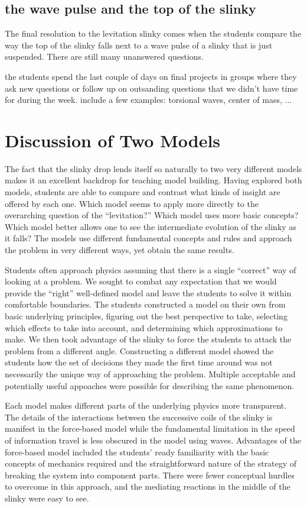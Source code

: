 \documentclass[aps,pre,10pt,superscriptaddress,showpacs,amsmath,amssymb,nofootinbib]{revtex4-1}
\begin{document}
\subsection{the wave pulse and the top of the slinky }
The final resolution to the levitation slinky comes when the students compare
the way the top of the slinky falls next to a wave pulse of a slinky that is
just suspended.  There are still many unanswered questions.

the students spend the last couple of days on final projects in groups where
they ask new questions or follow up on outsanding questions that we didn't have
time for during the week. include a few examples: torsional waves, center of 
mass, ...

\section{Discussion of Two Models}
\label{sec:discussion}

The fact that the slinky drop lends itself so naturally to two very different models
makes it an excellent backdrop for teaching model building. Having explored both
models, students are able to compare and contrast what kinds of insight are
offered by each one. Which model seems to apply more directly to the overarching
question of the ``levitation?'' Which model uses more basic concepts? Which model
better allows one to see the intermediate evolution of the slinky as it falls?
The models use different fundamental concepts and rules and approach
the problem in very different ways, yet obtain the same results.

Students often approach physics assuming that there is a single ``correct'' way
of looking at a problem. We sought to combat any expectation that we would
provide the ``right'' well-defined model and leave the students to solve it within
comfortable boundaries.
The students constructed a model on their own from basic underlying
principles, figuring out the best perspective to take, selecting which effects
to take into account, and determining which approximations to make.
We then took advantage of the slinky to force the students to attack the problem
from a different angle. Constructing a different model showed the students
how the set of decisions they made the first time around was not necessarily
the unique way of approaching the problem. Multiple acceptable and potentially
useful appoaches were possible for describing the same phenomenon.

Each model makes different parts of the underlying physics
more transparent. The details of the interactions between the successive coils
of the slinky is manifest in the force-based model while the fundamental
limitation in the speed of information travel is less obscured in the model
using waves. Advantages of the force-based model included the students' ready
familiarity with the basic concepts of mechanics required and the straightforward
nature of the strategy of breaking the system into component parts. There were
fewer conceptual hurdles to overcome in this approach, and the mediating
reactions in the middle of the slinky were easy to see. 
\end{document}

